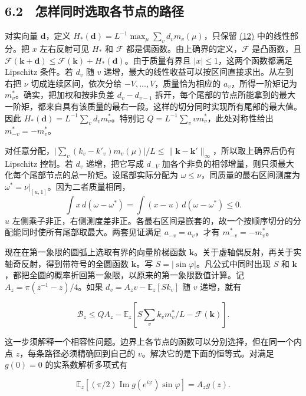 \documentclass[11pt,a4paper]{article}
\begin{document}
\subsection{6.2　怎样同时选取各节点的路径}\label{ux600eux6837ux540cux65f6ux9009ux53d6ux5404ux8282ux70b9ux7684ux8defux5f84}

对实向量 \(\mathbf d\)，定义 \(H_*(\mathbf d)=L^{-1}\max_\mu\sum_vd_vm_v(\mu)\)，只保留 \hyperref[eq:12]{(12)} 中的线性部分。把 \(x\) 左右反射可见 \(H_*\) 和 \(\mathcal F\) 都是偶函数。由上确界的定义，\(\mathcal F\) 是凸函数，且 \(\mathcal F(\mathbf k+\mathbf d)\le\mathcal F(\mathbf k)+H_*(\mathbf d)\)。由于质量有界且 \(|x|\le1\)，这两个函数都满足 Lipschitz 条件。若 \(d_v\) 随 \(v\) 递增，最大的线性收益可以按区间直接求出。从左到右把 \(\nu\) 切成连续区间，依次分给 \(-V,\ldots,V\)，质量恰为相应的 \(a_v\)，所得一阶矩记为 \(m_v^*\)。确实，把加权和按非负差 \(d_v-d_{v-1}\) 拆开，每个尾部的节点所能拿到的最大一阶矩，都来自具有该质量的最右一段。这样的切分同时实现所有尾部的最大值。因此 \(H_*(\mathbf d)=L^{-1}\sum_vd_vm_v^*\)。特别记 \(Q=L^{-1}\sum_vv m_v^*\)，此处对称性给出 \(m_{-v}^*=-m_v^*\)。

对任意分配，\(\big|\sum_v(k_v-k'_v)m_v(\mu)\big|/L\le\|\mathbf k-\mathbf k'\|_\infty\)，所以取上确界后仍有 Lipschitz 控制。若 \(d_v\) 递增，把它写成 \(d_{-V}\) 加各个非负的相邻增量，则只须最大化每个尾部节点的总一阶矩。设尾部实际分配为 \(\omega\le\nu\)，同质量的最右区间测度为 \(\omega^*=\nu|_{[u,1]}\)。因为二者质量相同， \[
 \int x\,d(\omega-\omega^*)=\int(x-u)\,d(\omega-\omega^*)\le0 .
\] \(u\) 左侧乘子非正，右侧测度差非正。各最右区间是嵌套的，故一个按顺序切分的分配能同时使所有尾部取最大。两套见证满足 \(a_{-v}=a_v\)，才有 \(m_{-v}^*=-m_v^*\)。

现在在第一象限的圆弧上选取有界的向量阶梯函数 \(\mathbf k\)。关于虚轴偶反射，再关于实轴奇反射，得到带符号的全圆函数 \(\widetilde{\mathbf k}\)。写 \(S=|\sin\varphi|\)。凡公式中同时出现 \(S\) 和 \(\mathbf k\)，都把全圆的概率折回第一象限，以原来的第一象限数值计算。记 \(A_z=\pi(z^{-1}-z)/4\)。如果 \(d_v=A_zv-\mathbb E_z[Sk_v]\) 随 \(v\) 递增，就有

\[
 \mathcal B_z\le Q A_z-
 \mathbb E_z\left[S\sum_v k_v m_v^*/L-\mathcal F(\mathbf k)\right].       \tag{19}\label{eq:19}
\]

这一步须解释一个相容性问题。边界上各节点的函数可以分别选择，但在同一个内点 \(z\)，每条路径必须精确回到自己的 \(v\)。解决它的是下面的恒等式。对满足 \(g(0)=0\) 的实系数解析多项式有

\[
 \mathbb E_z[(\pi/2)\operatorname{Im}g(e^{i\varphi})\sin\varphi]=A_zg(z).
                                                                            \tag{20}\label{eq:20}
\]
\end{document}
